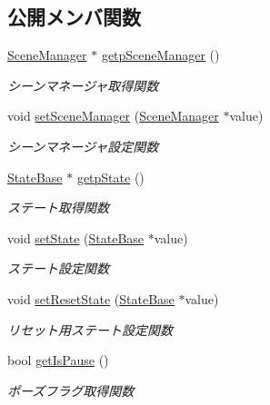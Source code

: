 \subsection*{公開メンバ関数}
\begin{DoxyCompactItemize}
\item 
\mbox{\hyperlink{class_scene_manager}{Scene\+Manager}} $\ast$ \mbox{\hyperlink{class_scene_base_a4c0b75d2f7ead08828f1e5064aa99720}{getp\+Scene\+Manager}} ()
\begin{DoxyCompactList}\small\item\em シーンマネージャ取得関数 \end{DoxyCompactList}\item 
void \mbox{\hyperlink{class_scene_base_aae1930cae97c27ee7d54b4bd8896a515}{set\+Scene\+Manager}} (\mbox{\hyperlink{class_scene_manager}{Scene\+Manager}} $\ast$value)
\begin{DoxyCompactList}\small\item\em シーンマネージャ設定関数 \end{DoxyCompactList}\item 
\mbox{\hyperlink{class_scene_base_1_1_state_base}{State\+Base}} $\ast$ \mbox{\hyperlink{class_scene_base_acfea243cbece18d596f2dacad19a345c}{getp\+State}} ()
\begin{DoxyCompactList}\small\item\em ステート取得関数 \end{DoxyCompactList}\item 
void \mbox{\hyperlink{class_scene_base_a95d33774db6a05cf1e9da201720ea3db}{set\+State}} (\mbox{\hyperlink{class_scene_base_1_1_state_base}{State\+Base}} $\ast$value)
\begin{DoxyCompactList}\small\item\em ステート設定関数 \end{DoxyCompactList}\item 
void \mbox{\hyperlink{class_scene_base_a3d19d74cca158aee1affd1498bf1bd90}{set\+Reset\+State}} (\mbox{\hyperlink{class_scene_base_1_1_state_base}{State\+Base}} $\ast$value)
\begin{DoxyCompactList}\small\item\em リセット用ステート設定関数 \end{DoxyCompactList}\item 
bool \mbox{\hyperlink{class_scene_base_a2c3a13167da6971cb6c61b439b214654}{get\+Is\+Pause}} ()
\begin{DoxyCompactList}\small\item\em ポーズフラグ取得関数 \end{DoxyCompactList}\item 

\end{DoxyCompactItemize}
